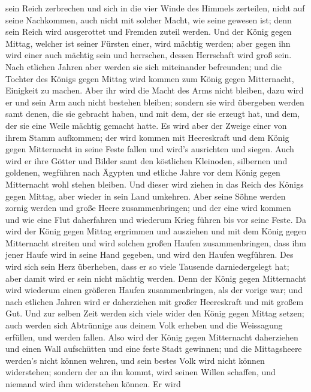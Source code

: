 sein Reich zerbrechen und sich in die vier Winde des Himmels zerteilen,
nicht auf seine Nachkommen, auch nicht mit solcher Macht, wie seine
gewesen ist; denn sein Reich wird ausgerottet und Fremden zuteil werden.
 Und der König gegen Mittag, welcher ist seiner Fürsten
einer, wird mächtig werden; aber gegen ihn wird einer auch mächtig sein
und herrschen, dessen Herrschaft wird groß sein.  Nach
etlichen Jahren aber werden sie sich miteinander befreunden; und die
Tochter des Königs gegen Mittag wird kommen zum König gegen Mitternacht,
Einigkeit zu machen. Aber ihr wird die Macht des Arms nicht bleiben,
dazu wird er und sein Arm auch nicht bestehen bleiben; sondern sie wird
übergeben werden samt denen, die sie gebracht haben, und mit dem, der
sie erzeugt hat, und dem, der sie eine Weile mächtig gemacht hatte.
 Es wird aber der Zweige einer von ihrem Stamm aufkommen;
der wird kommen mit Heereskraft und dem König gegen Mitternacht in seine
Feste fallen und wird's ausrichten und siegen.  Auch wird er
ihre Götter und Bilder samt den köstlichen Kleinoden, silbernen und
goldenen, wegführen nach Ägypten und etliche Jahre vor dem König gegen
Mitternacht wohl stehen bleiben.  Und dieser wird ziehen in
das Reich des Königs gegen Mittag, aber wieder in sein Land umkehren.
 Aber seine Söhne werden zornig werden und große Heere
zusammenbringen; und der eine wird kommen und wie eine Flut daherfahren
und wiederum Krieg führen bis vor seine Feste.  Da wird der
König gegen Mittag ergrimmen und ausziehen und mit dem König gegen
Mitternacht streiten und wird solchen großen Haufen zusammenbringen,
dass ihm jener Haufe wird in seine Hand gegeben,  und wird
den Haufen wegführen. Des wird sich sein Herz überheben, dass er so
viele Tausende darniedergelegt hat; aber damit wird er sein nicht
mächtig werden.  Denn der König gegen Mitternacht wird
wiederum einen größeren Haufen zusammenbringen, als der vorige war; und
nach etlichen Jahren wird er daherziehen mit großer Heereskraft und mit
großem Gut.  Und zur selben Zeit werden sich viele wider
den König gegen Mittag setzen; auch werden sich Abtrünnige aus deinem
Volk erheben und die Weissagung erfüllen, und werden fallen.
 Also wird der König gegen Mitternacht daherziehen und
einen Wall aufschütten und eine feste Stadt gewinnen; und die
Mittagsheere werden's nicht können wehren, und sein bestes Volk wird
nicht können widerstehen;  sondern der an ihn kommt, wird
seinen Willen schaffen, und niemand wird ihm widerstehen können. Er wird
